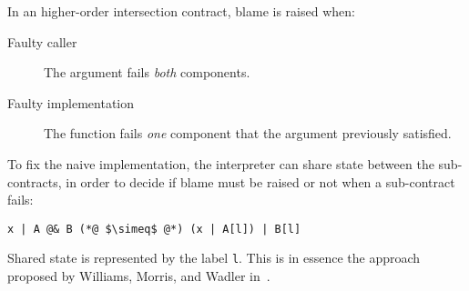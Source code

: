 \documentclass[sigplan,10pt,review,anonymous]{acmart}
\newcommand{\nickel}[1]{\lstinline[language=nickel]{#1}}
\begin{document}
In an higher-order intersection contract, blame is raised when:
\begin{description}
    \item[Faulty caller] The argument fails \emph{both} components.
    \item[Faulty implementation] The function fails \emph{one} component that the
        argument previously satisfied.
\end{description}


%

To fix the naive implementation, the interpreter can share state between the
sub-contracts, in order to decide if blame must be raised or not when a
sub-contract fails:

\begin{lstlisting}[language=nickel,frame=none,numbers=none]
x | A @& B (*@ $\simeq$ @*) (x | A[l]) | B[l]
\end{lstlisting}

Shared state is represented by the label \nickel{l}. This is in essence the
approach proposed by Williams, Morris, and Wadler in~\cite{RootCauseOfBlame}.
\end{document}

